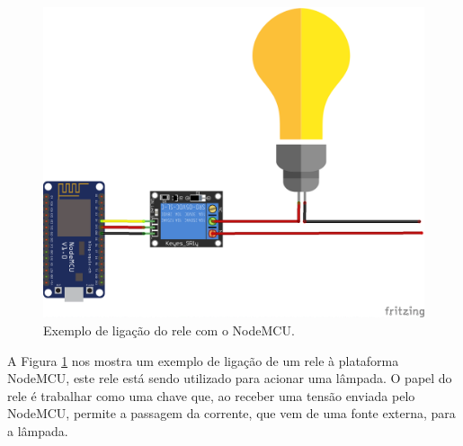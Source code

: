 \begin{figure}[H]
\centering
\includegraphics[scale=0.7]{./04-figuras/rele-node.png}
\caption{Exemplo de ligação do rele com o NodeMCU.}
\vspace{-\baselineskip}
\label{fig:releligacao}
\end{figure}

A Figura \ref{fig:releligacao} nos mostra um exemplo de ligação de um rele à plataforma NodeMCU, este rele está sendo utilizado para acionar uma lâmpada. O papel do rele é trabalhar como uma chave que, ao receber uma tensão enviada pelo NodeMCU, permite a passagem da corrente, que vem de uma fonte externa, para a lâmpada.